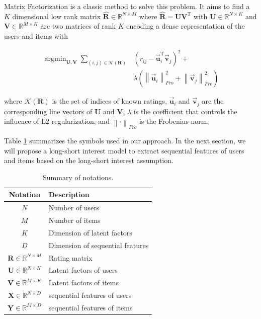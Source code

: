 \documentclass{llncs}
\DeclareMathOperator*{\argmin}{argmin}
\begin{document}
Matrix Factorization is a classic method to solve this problem.
It aims to find a $K$ dimensional low rank matrix $\mathbf{\hat{R}} \in \mathbb{R}^{N \times M}$
where $\mathbf{\hat{R}} = \mathbf{U} \mathbf{V}^\mathrm{T}$ with
$\mathbf{U} \in \mathbb{R}^{N \times K}$ and $\mathbf{V} \in \mathbb{R}^{M \times K}$
are two matrices of rank $K$ encoding a dense representation of the users and items with

\begin{equation}
\begin{aligned}
\argmin_{\mathbf{U},\mathbf{V}}
\sum_{(i,j) \in \mathcal{K}(\mathbf{R})}
&( r_{ij} - \vec{\mathbf{u}}_i^{\mathrm{T}} \vec{\mathbf{v}}_j ) ^ 2 + \\
&\lambda ( \left\| \vec{\mathbf{u}}_i \right\|_{Fro}^2 +
\left\| \vec{\mathbf{v}}_j \right\|_{Fro}^2 )
\end{aligned}
\end{equation}

where $\mathcal{K}(\mathbf{R})$ is the set of indices of known ratings,
$\vec{\mathbf{u}}_i$ and $\vec{\mathbf{v}}_j$
are the corresponding line vectors of $\mathbf{U}$ and $\mathbf{V}$,
$\lambda$ is the coefficient that controls the influence of L2 regularization,
and $\left\| \cdot \right\|_{Fro}$ is the Frobenius norm.

Table \ref{tab:notations} summarizes the symbols used in our approach.
In the next section, we will propose a long-short interest model
to extract sequential features of users and items based on the long-short interest assumption.

\begin{table}[htbp]
	\centering
	\caption{Summary of notations.}
	\label{tab:notations}
	\begin{tabular}{|c|l|}
		\hline
		\textbf{Notation} & \textbf{Description} \\
		\hline
		$N$ & Number of users \\
		$M$ & Number of items \\
		$K$ & Dimension of latent factors \\
		$D$ & Dimension of sequential features \\
		$\mathbf{R} \in \mathbb{R}^{N \times M}$ & Rating matrix \\
		$\mathbf{U} \in \mathbb{R}^{N \times K}$ & Latent factors of users \\
		$\mathbf{V} \in \mathbb{R}^{M \times K}$ & Latent factors of items \\
		$\mathbf{X} \in \mathbb{R}^{N \times D}$ & sequential features of users \\
		$\mathbf{Y} \in \mathbb{R}^{M \times D}$ & sequential features of items \\
		\hline
	\end{tabular}
\end{table}
\end{document}
